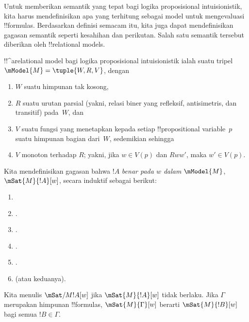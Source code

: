 \documentclass[../../../include/open-logic-section]{subfiles}
\begin{document}


Untuk memberikan semantik yang tepat bagi logika proposisional
intuisionistik, kita harus mendefinisikan apa yang terhitung sebagai model
untuk mengevaluasi !!{formula}s. Berdasarkan
definisi semacam itu, kita juga dapat mendefinisikan gagasan semantik seperti
kesahihan dan perikutan. Salah satu semantik tersebut diberikan oleh
!!{relational model}s.

\begin{defn}
  !!^a{relational model} bagi logika proposisional intuisionistik ialah suatu
  tripel $\mModel{M} = \tuple{W, R, V}$, dengan
  \begin{enumerate}
  \item $W$ suatu himpunan tak kosong,
  \item $R$ suatu urutan parsial (yakni, relasi biner yang refleksif,
    antisimetris, dan transitif) pada~$W$, dan
  \item $V$ suatu fungsi yang menetapkan kepada setiap !!{propositional
    variable}~$p$ suatu himpunan bagian dari~$W$, sedemikian sehingga
  \item $V$ monoton terhadap $R$; yakni, jika $w \in V(p)$ dan $Rww'$, maka
    $w' \in V(p)$.
  \end{enumerate}
\end{defn}

\begin{defn}
  Kita mendefinisikan gagasan bahwa $!A$ \emph{benar pada $w$ dalam
    $\mModel{M}$}, $\mSat{M}{!A}[w]$, secara induktif sebagai berikut:
  \begin{enumerate}
  \item {}
  \item {}.
  \item {}.
  \item {}.
  \item {}.
  \item {} (atau keduanya).
  \end{enumerate}
  Kita menulis $\mSat/{M}{!A}[w]$ jika $\mSat{M}{!A}[w]$ tidak berlaku. Jika
  $\Gamma$ merupakan himpunan !!{formula}s, $\mSat{M}{\Gamma}[w]$ berarti
  $\mSat{M}{!B}[w]$ bagi semua $!B \in \Gamma$.
\end{defn}
\end{document}

